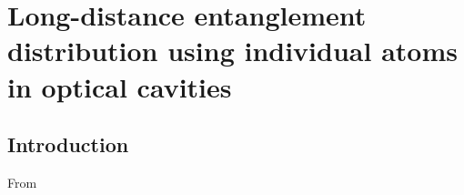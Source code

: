 \chapter{Long-distance entanglement distribution using individual atoms in
optical cavities}
\label{ch:Borregaard2015b}
 
\section{Introduction}
From \cite{Borregaard2015b}